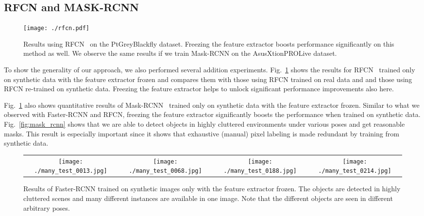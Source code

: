 \documentclass[10pt,twocolumn,letterpaper]{article}
\newcommand{\comment}[1]{}
\newcommand{\imgspace}[0]{\hspace{-0.3cm}}
\newcommand{\asus}[0]{AsusXtionPROLive\xspace}
\newcommand{\ptgrey}[0]{PtGreyBlackfly\xspace}
\begin{document}
\subsection{RFCN and MASK-RCNN}
\label{sec:other_detectors}

\begin{figure}[ht]
\begin{center}
\texttt{[image: ./rfcn.pdf]}
\end{center}
\caption{\label{fig:rfcn}  Results   using  RFCN~\cite{rfcn}  on   the  \ptgrey
  dataset. Freezing  the feature  extractor boosts performance  significantly on
  this method as well.  We observe the same results if  we train Mask-RCNN on
    the \asus dataset.}
\end{figure}


To  show the  generality of  our approach,  we also  performed several  addition
experiments.  Fig.~\ref{fig:rfcn} shows the results for RFCN~\cite{rfcn} trained
only on  synthetic data with  the feature  extractor frozen and  compares them
with those  using RFCN  trained on  real data and  and those
using RFCN re-trained on synthetic data. Freezing the feature extractor helps to
unlock significant performance improvements also here.


Fig.~\ref{fig:rfcn} also shows quantitative  results of Mask-RCNN~\cite{mask_rcnn} trained only
on  synthetic data  with  the  feature extractor  frozen.   Similar  to what  we
observed with Faster-RCNN and RFCN, freezing the feature extractor significantly
boosts the performance when  trained on synthetic data. Fig.~\ref{fig:mask_rcnn}
shows that we are able to  detect objects in highly cluttered environments under
various poses  and get  reasonable masks.  This  result is  especially important
since it  shows that  exhaustive (manual)  pixel labeling  is made  redundant by
training from synthetic data.


\comment{Re-training Mask-RCNN  on  synthetic data results  in very  bad performance
similar as it is the case for Faster-RCNN and RFCN.}


\begin{figure*}
\begin{center}
\begin{tabular}{cccc}
\texttt{[image: ./many\_test\_0013.jpg]} & \imgspace
\texttt{[image: ./many\_test\_0068.jpg]} & \imgspace
\texttt{[image: ./many\_test\_0188.jpg]} & \imgspace
\texttt{[image: ./many\_test\_0214.jpg]} \\
\end{tabular}
\end{center}
\caption{\label{fig:results2} Results of Faster-RCNN trained on synthetic images
  only with  the feature extractor frozen.   The objects are detected  in highly
  cluttered  scenes and  many different  instances are  available in  one image.
  Note that the different objects are seen in different arbitrary poses.}
\end{figure*}
\end{document}
